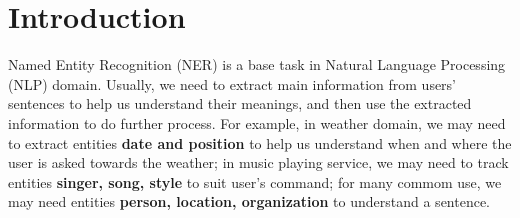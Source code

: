 \documentclass[letterpaper]{article} %
\begin{document}
%
%
%

\section{Introduction}
Named Entity Recognition (NER) is a base task in Natural Language Processing (NLP) domain. Usually, we need to extract main information from users' sentences to help us understand their meanings, and then use the extracted information to do further process. For example, in weather domain, we may need to extract entities \textbf{date and position} to help us understand when and where the user is asked towards the weather; in music playing service, we may need to track entities \textbf{singer, song, style}  to suit user's command; for 	many commom use, we may need entities \textbf{person, location, organization} to understand a sentence.
\end{document}
